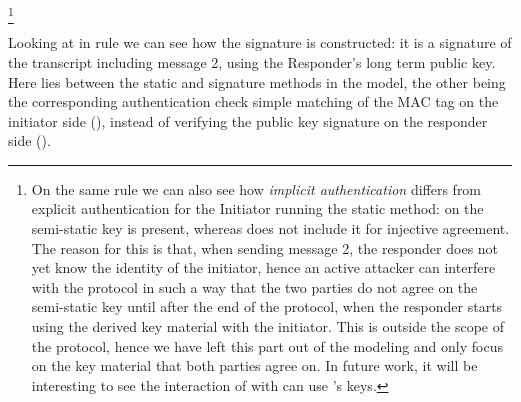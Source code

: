 %
%
\footnote{
On the same rule we can also see how \emph{implicit authentication}
differs from explicit authentication for the Initiator running the
static method: on  the semi-static key
\mGiy{} is present, whereas  does not include it
for injective agreement.
%
The reason for this is that, when sending message 2, the responder
does not yet know the identity of the initiator, hence an active
attacker can interfere with the protocol in such a way that the two
parties do not agree on the semi-static key
\mGiy{} until after the end of the protocol, when the responder
starts using the derived key material with the initiator.
%
This is outside the scope of the \mEdhoc{} protocol, hence we have left
this part out of the modeling and only focus on the key material that
both parties agree on.
%
In future work, it will be interesting to see the interaction of
\mEdhoc{} with \mOscore{} can use
\mEdhoc's keys.}


Looking at  in rule  we can
see how the signature  is constructed: it is a signature of the
transcript including message 2, using the Responder's long term public
key.
%
Here lies  between the static and signature methods
in the model, the other being the corresponding authentication check simple matching of the MAC tag on the initiator side 
%
(), instead of verifying the public key
signature on the responder side
%
().

